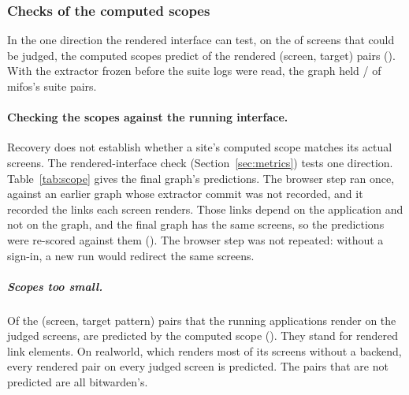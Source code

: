 \subsubsection{Checks of the computed scopes}
\label{sec:res-checks}

In the one direction the rendered interface can test, on the \ScopeJudged{} of \ScopeScreens{} screens that could be judged,
the computed scopes predict \ScopeConfirmed{} of the \ScopePairs{} rendered (screen, target) pairs
(\ScopeConfirmedShare{}). With the extractor frozen before the suite logs were read, the graph held
\EtoEMifosHitUnfixed{}/\EtoEMifosPairs{} of mifos's suite pairs.

\paragraph{Checking the scopes against the running interface.}
\label{sec:res-scope}

Recovery does not establish whether a site's computed scope matches its actual screens. The
rendered-interface check (Section~\ref{sec:metrics}) tests one direction. Table~\ref{tab:scope}
gives the final graph's predictions. The browser step ran once, against an earlier graph whose
extractor commit was not recorded, and it recorded the links each screen renders. Those links
depend on the application and not on the graph, and the final graph has the same screens, so the
predictions were re-scored against them (). The browser step was
not repeated: without a sign-in, a new run would redirect the same screens.

\begin{table}[t]\small
\caption{Scope predictions of the final graph against the rendered interface, on the \ScopeApps{} applications the harness could serve.}
\label{tab:scope}
\TabScope
\par{}
\end{table}

\subparagraph{Scopes too small.} Of the \ScopePairs{} (screen, target pattern) pairs that the running
applications render on the judged screens, \ScopeConfirmed{} are predicted by the computed scope
(\ScopeConfirmedShare{}). They stand for \ScopeAnchors{} rendered link elements. On
realworld, which renders most of its screens without a backend, every rendered pair on every
judged screen is predicted. The pairs that are not predicted are all bitwarden's.

